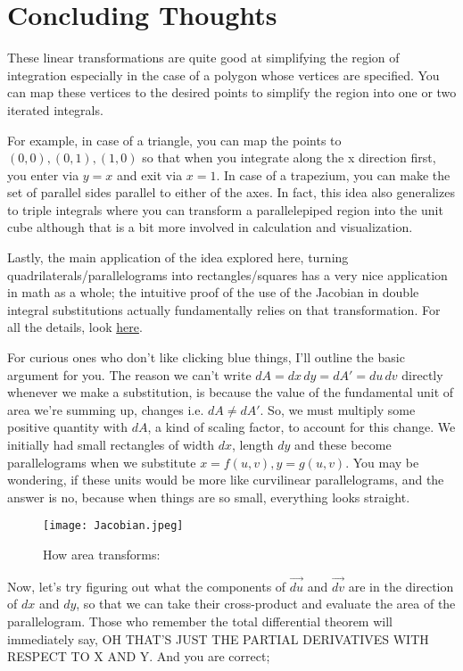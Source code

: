 \documentclass{article}
\begin{document}
\section{Concluding Thoughts}
These linear transformations are quite good at simplifying the region of integration especially in the case of a polygon whose vertices are specified. You can map these vertices to the desired points to simplify the region into one or two iterated integrals. 

For example, in case of a triangle, you can map the points to $(0,0),(0,1),(1,0)$ so that when you integrate along the x direction first, you enter via $y=x$ and exit via $x=1$. In case of a trapezium, you can make the set of parallel sides parallel to either of the axes. In fact, this idea also generalizes to triple integrals where you can transform a parallelepiped region into the unit cube although that is a bit more involved in calculation and visualization. 

Lastly, the main application of the idea explored here, turning quadrilaterals/parallelograms into rectangles/squares has a very nice application in math as a whole; the intuitive proof of the use of the Jacobian in double integral substitutions actually fundamentally relies on that transformation. For all the details, look \href{https://math.stackexchange.com/questions/267267/intuitive-proof-of-multivariable-changing-of-variables-formula-jacobian-withou}{here}. 
\newline

For curious ones who don't like clicking blue things, I'll outline the basic argument for you. The reason we can't write $dA= dx \, dy = dA'= du \, dv$ directly whenever we make a substitution, is because the value of the fundamental unit of area we're summing up, changes i.e. $dA \neq dA'$. So, we must multiply some positive quantity with $dA$, a kind of scaling factor, to account for this change. We initially had small rectangles of width $dx$, length $dy$ and these become parallelograms when we substitute $x=f(u,v),y=g(u,v)$. You may be wondering, if these units would be more like curvilinear parallelograms, and the answer is no, because when things are so small, everything looks straight. 
\begin{figure}[h]
    \centering
    \texttt{[image: Jacobian.jpeg]}
    \caption{How area transforms:}
    \label{fig:enter-label}
\end{figure}

Now, let's try figuring out what the components of $\vec{du}$ and $\vec{dv}$ are in the direction of $dx$ and $dy$, so that we can take their cross-product and evaluate the area of the parallelogram. Those who remember the total differential theorem will immediately say, OH THAT'S JUST THE PARTIAL DERIVATIVES WITH RESPECT TO X AND Y. And you are correct; 
\end{document}
